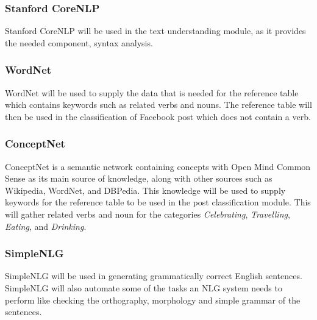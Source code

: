\subsubsection{Stanford CoreNLP}
Stanford CoreNLP will be used in the text understanding module, as it provides the needed component, syntax analysis. 

\subsubsection{WordNet}
WordNet will be used to supply the data that is needed for the reference table which contains keywords such as related verbs and nouns. The reference table will then be used in the classification of Facebook post which does not contain a verb.

\subsubsection{ConceptNet}
ConceptNet is a semantic network containing concepts with Open Mind Common Sense as its main source of knowledge, along with other sources such as Wikipedia, WordNet, and DBPedia. This knowledge will be used to supply keywords for the reference table to be used in the post classification module. This will gather related verbs and noun for the categories \textit{Celebrating}, \textit{Travelling}, \textit{Eating}, and \textit{Drinking}.

\subsubsection{SimpleNLG}
SimpleNLG will be used in generating grammatically correct English sentences. SimpleNLG will also automate some of the tasks an NLG system needs to perform like checking the orthography, morphology and simple grammar of the sentences.